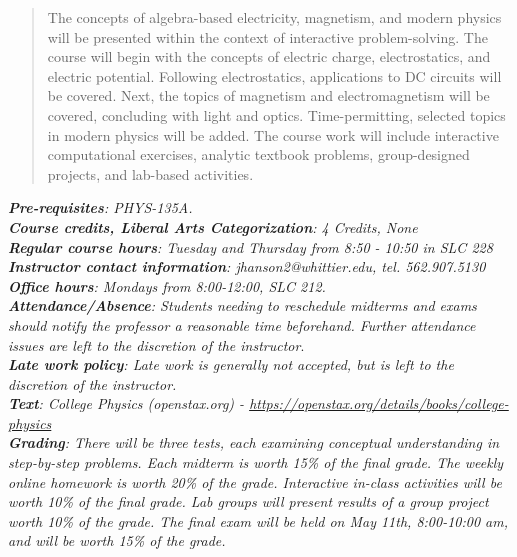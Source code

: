 \documentclass[10pt]{article}
\begin{document}
\maketitle

\begin{abstract}
The concepts of algebra-based electricity, magnetism, and modern physics will be presented within the context of interactive problem-solving.  The course will begin with the concepts of electric charge, electrostatics, and electric potential.  Following electrostatics, applications to DC circuits will be covered.  Next, the topics of magnetism and electromagnetism will be covered, concluding with light and optics.  Time-permitting, selected topics in modern physics will be added.  The course work will include interactive computational exercises, analytic textbook problems, group-designed projects, and lab-based activities.
\end{abstract}
\noindent
\textit{\textbf{Pre-requisites}: PHYS-135A.} \\
\textit{\textbf{Course credits, Liberal Arts Categorization}: 4 Credits, None} \\
\textit{\textbf{Regular course hours}: Tuesday and Thursday from 8:50 - 10:50 in SLC 228} \\
\textit{\textbf{Instructor contact information}: jhanson2@whittier.edu, tel. 562.907.5130} \\
\textit{\textbf{Office hours}: Mondays from 8:00-12:00, SLC 212.} \\
\textit{\textbf{Attendance/Absence}: Students needing to reschedule midterms and exams should notify the professor a reasonable time beforehand. Further attendance issues are left to the discretion of the instructor}.\\ 
\textit{\textbf{Late work policy}: Late work is generally not accepted, but is left to the discretion of the instructor.} \\
\textit{\textbf{Text}: College Physics (openstax.org) -  \url{https://openstax.org/details/books/college-physics}} \\
\textit{\textbf{Grading}: There will be three tests, each examining conceptual understanding in step-by-step problems. Each midterm is worth 15\% of the final grade. The weekly online homework is worth 20\% of the grade. Interactive in-class activities will be worth 10\% of the final grade. Lab groups will present results of a group project worth 10\% of the grade. The final exam will be held on May 11th, 8:00-10:00 am, and will be worth 15\% of the grade.} \\
\end{document}

